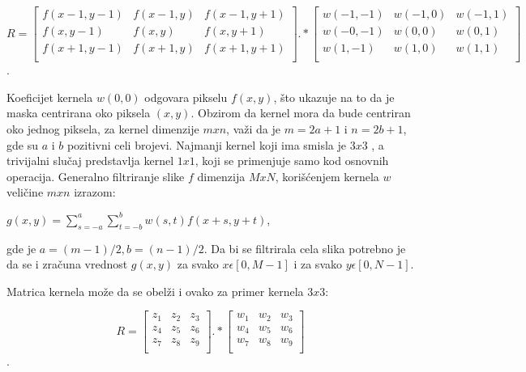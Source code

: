 \documentclass[a4paper,12pt,titlepage]{article}
\begin{document}
\[
R
=
\begin{bmatrix}
     f(x - 1, y - 1) & f(x - 1, y) & f(x - 1, y + 1) \\
     f(x, y - 1) & f(x , y) & f(x, y + 1) \\
     f(x + 1, y - 1) & f(x + 1, y) & f(x + 1, y + 1) \\
\end{bmatrix}
.*
\begin{bmatrix}
     w(- 1, - 1) & w(- 1, 0) & w(- 1, 1) \\
     w(-0, - 1) & w(0, 0) & w(0, 1) \\
     w(1, - 1) & w(1, 0) & w(1, 1) \\
\end{bmatrix}
\].

Koeficijet kernela $w(0, 0)$ odgovara pikselu $f(x, y)$, što ukazuje na to da je maska centrirana oko piksela $(x, y)$. Obzirom da kernel mora da bude centriran oko jednog piksela, za kernel dimenzije $m x n$, važi da je $m = 2a + 1$ i $n = 2b + 1$, gde su $a$ i $b$ pozitivni celi brojevi. Najmanji kernel koji ima smisla je $3 x 3$ , a trivijalni slučaj predstavlja kernel $1 x 1$, koji se primenjuje samo kod osnovnih operacija. Generalno filtriranje slike $f$ dimenzija $M x N$, korišćenjem kernela $w$ veličine $m x n$ izrazom:

\begin{center}
$g(x, y)  = \sum_{s = -a}^{a} \sum_{t = -b}^{b} w(s, t) f(x + s, y + t)$,\\
\end{center}

gde je $a = (m - 1) / 2, b = (n - 1) / 2$. Da bi se filtrirala cela slika potrebno je da se i zračuna vrednost $g(x, y)$ za svako $x \epsilon [0, M - 1]$ i za svako $y \epsilon [0, N - 1]$. 

Matrica kernela može da se obelži i ovako za primer kernela $3 x 3$:

\[
R
=
\begin{bmatrix}
     z_{1} & z_{2} & z_{3} \\
     z_{4} & z_{5} & z_{6} \\
     z_{7} & z_{8} & z_{9} \\
\end{bmatrix}
.*
\begin{bmatrix}
     w_{1} & w_{2} & w_{3} \\
     w_{4} & w_{5} & w_{6} \\
     w_{7} & w_{8} & w_{9} \\
\end{bmatrix}
\].
\end{document}
